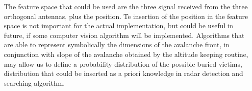 The feature space that could be used are the three signal received from the three orthogonal antennas, plus the position. Te insertion of the position in the feature space is not important for the actual implementation, but could be useful in future, if some computer vision algorithm will be implemented. Algorithms that are able to represent symbolically the dimensions of the avalanche front, in conjunction with slope of the avalanche obtained by the altitude keeping routine, may allow us to define a probability distribution of the possible buried victims, distribution that could be inserted as a priori knowledge in radar detection and searching algorithm.
\FloatBarrier